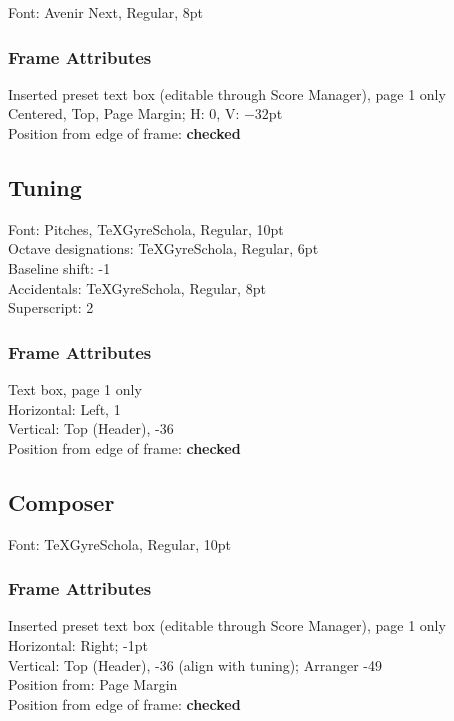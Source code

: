 \documentclass[10pt,twoside]{article} %
\begin{document}
Font: Avenir Next, Regular, 8pt

\subsubsection{Frame Attributes}
\label{sec:frame-attributes}

Inserted preset text box (editable through Score Manager), page 1 only\\
Centered, Top, Page Margin; H: 0, V: $-32$pt\\
Position from edge of frame: \textbf{checked}

\subsection{Tuning}
\label{sec:tuning}

Font: Pitches, TeXGyreSchola, Regular, 10pt\\
\indent Octave designations: TeXGyreSchola, Regular, 6pt\\
\indent Baseline shift: -1\\
Accidentals: TeXGyreSchola, Regular, 8pt\\
\indent Superscript: 2

\subsubsection{Frame Attributes}
\label{sec:frame-attributes-1}

Text box, page 1 only\\
Horizontal: Left, 1\\
Vertical: Top (Header), -36\\
Position from edge of frame: \textbf{checked}

\subsection{Composer}
\label{sec:composer}

Font: TeXGyreSchola, Regular, 10pt\\

\subsubsection{Frame Attributes}
\label{sec:frame-attributes-2}

Inserted preset text box (editable through Score Manager), page 1 only\\
Horizontal: Right; -1pt\\
Vertical: Top (Header), -36 (align with tuning); Arranger -49\\
Position from: Page Margin\\
Position from edge of frame: \textbf{checked}\\
\end{document}
